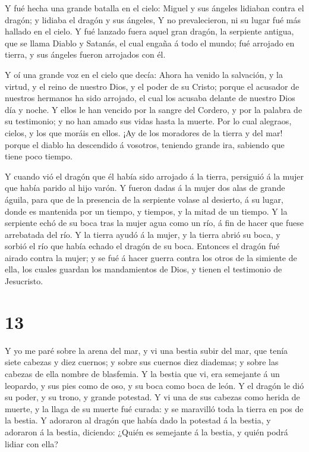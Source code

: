  Y fué hecha una grande batalla en el cielo: Miguel y sus
ángeles lidiaban contra el dragón; y lidiaba el dragón y sus ángeles,
 Y no prevalecieron, ni su lugar fué más hallado en el
cielo.  Y fué lanzado fuera aquel gran dragón, la serpiente
antigua, que se llama Diablo y Satanás, el cual engaña á todo el mundo;
fué arrojado en tierra, y sus ángeles fueron arrojados con él.

 Y oí una grande voz en el cielo que decía: Ahora ha venido
la salvación, y la virtud, y el reino de nuestro Dios, y el poder de su
Cristo; porque el acusador de nuestros hermanos ha sido arrojado, el
cual los acusaba delante de nuestro Dios día y noche.  Y
ellos le han vencido por la sangre del Cordero, y por la palabra de su
testimonio; y no han amado sus vidas hasta la muerte.  Por
lo cual alegraos, cielos, y los que moráis en ellos. ¡Ay de los
moradores de la tierra y del mar! porque el diablo ha descendido á
vosotros, teniendo grande ira, sabiendo que tiene poco tiempo.

 Y cuando vió el dragón que él había sido arrojado á la
tierra, persiguió á la mujer que había parido al hijo varón.
 Y fueron dadas á la mujer dos alas de grande águila, para
que de la presencia de la serpiente volase al desierto, á su lugar,
donde es mantenida por un tiempo, y tiempos, y la mitad de un tiempo.
 Y la serpiente echó de su boca tras la mujer agua como un
río, á fin de hacer que fuese arrebatada del río.  Y la
tierra ayudó á la mujer, y la tierra abrió su boca, y sorbió el río que
había echado el dragón de su boca.  Entonces el dragón fué
airado contra la mujer; y se fué á hacer guerra contra los otros de la
simiente de ella, los cuales guardan los mandamientos de Dios, y tienen
el testimonio de Jesucristo.

\hypertarget{section-12}{%
\section{13}\label{section-12}}

 Y yo me paré sobre la arena del mar, y vi una bestia subir
del mar, que tenía siete cabezas y diez cuernos; y sobre sus cuernos
diez diademas; y sobre las cabezas de ella nombre de blasfemia.
 Y la bestia que vi, era semejante á un leopardo, y sus pies
como de oso, y su boca como boca de león. Y el dragón le dió su poder, y
su trono, y grande potestad.  Y vi una de sus cabezas como
herida de muerte, y la llaga de su muerte fué curada: y se maravilló
toda la tierra en pos de la bestia.  Y adoraron al dragón
que había dado la potestad á la bestia, y adoraron á la bestia,
diciendo: ¿Quién es semejante á la bestia, y quién podrá lidiar con
ella?


